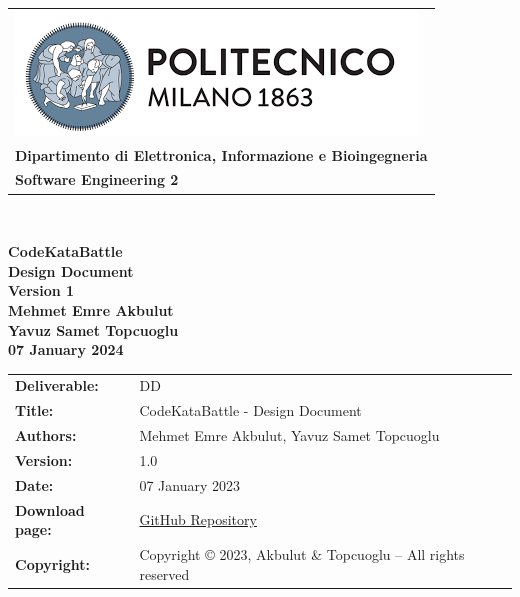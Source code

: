 \documentclass [11pt,twoside]{article}
\begin{document}

\begin{titlepage}



\begin{table}[t!]
\centering
\begin{tabu} to \textwidth { X[c] }
\includegraphics[scale=0.5]{Images/PolimiLogo} \\
\textbf{\small{Dipartimento di Elettronica, Informazione e Bioingegneria}} \\ 
\textbf{\small{Software Engineering 2}} \\
\end{tabu}
\end{table} ~
\\ [4cm]


\begin{center}
{\textbf{\Huge{CodeKataBattle}}} \\ 
\vspace{2mm}
{\textbf{\small{Design Document}}} \\ 
{\textbf{\footnotesize{Version 1}}} \\ [4cm]
\textbf{\small{Mehmet Emre Akbulut}} \\
\vspace{1mm}
\textbf{\small{Yavuz Samet Topcuoglu}} \\ [1cm]
\textbf{\footnotesize{07 January 2024}}
\end{center}





\end{titlepage}

\begin{table}[h!]
\begin{tabu} to \textwidth { X[0.3,r,p] X[0.7,l,p] }
\hline

\textbf{Deliverable:} & DD\\
\textbf{Title:} & CodeKataBattle - Design Document \\
\textbf{Authors:} & Mehmet Emre Akbulut, Yavuz Samet Topcuoglu \\
\textbf{Version:} & 1.0 \\ 
\textbf{Date:} & 07 January 2023 \\
\textbf{Download page:} & \href{https://github.com/mehmetemreakbulut/AkbulutTopcuoglu}{GitHub Repository} \\
\textbf{Copyright:} & Copyright © 2023, Akbulut \& Topcuoglu – All rights reserved \\
\hline
\end{tabu}
\end{table}
\end{document}
